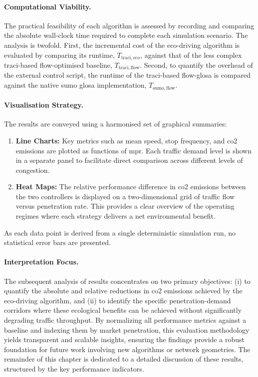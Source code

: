 \paragraph{Computational Viability.}
The practical feasibility of each algorithm is assessed by recording and comparing the absolute wall-clock time required to complete each simulation scenario. The analysis is twofold. First, the incremental cost of the eco-driving algorithm is evaluated by comparing its runtime, $T_{\mathrm{traci,eco}}$, against that of the less complex \ac{traci}-based flow-optimised baseline, $T_{\mathrm{traci,flow}}$. Second, to quantify the overhead of the external control script, the runtime of the \ac{traci}-based \ac{flow-glosa} is compared against the native \ac{sumo} \ac{glosa} implementation, $T_{\mathrm{sumo,flow}}$.
\paragraph{Visualisation Strategy.}
The results are conveyed using a harmonised set of graphical summaries:
\begin{enumerate}[label=\textbf{(\alph*)},leftmargin=*]
    \item \textbf{Line Charts:} Key metrics such as mean speed, stop frequency, and \ac{co2} emissions are plotted as functions of \ac{mpr}. Each traffic demand level is shown in a separate panel to facilitate direct comparison across different levels of congestion.
    \item \textbf{Heat Maps:} The relative performance difference in \ac{co2} emissions between the two controllers is displayed on a two-dimensional grid of traffic flow versus penetration rate. This provides a clear overview of the operating regimes where each strategy delivers a net environmental benefit.
\end{enumerate}
As each data point is derived from a single deterministic simulation run, no statistical error bars are presented.

\paragraph{Interpretation Focus.}
The subsequent analysis of results concentrates on two primary objectives: (i) to quantify the absolute and relative reductions in \ac{co2} emissions achieved by the eco-driving algorithm, and (ii) to identify the specific penetration-demand corridors where these ecological benefits can be achieved without significantly degrading traffic throughput. By normalizing all performance metrics against a baseline and indexing them by market penetration, this evaluation methodology yields transparent and scalable insights, ensuring the findings provide a robust foundation for future work involving new algorithms or network geometries.
\mynewline
The remainder of this chapter is dedicated to a detailed discussion of these results, structured by the key performance indicators.